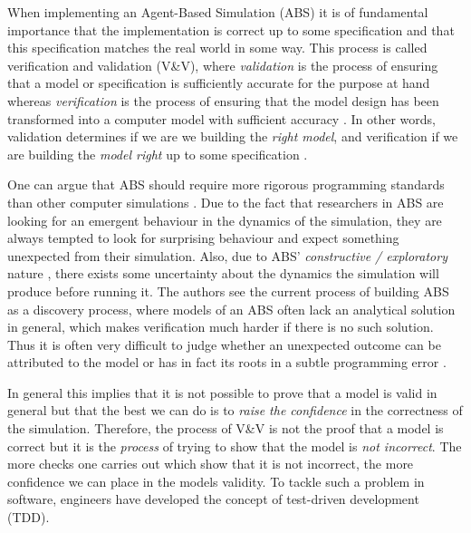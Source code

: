 \label{ch:property}

When implementing an Agent-Based Simulation (ABS) it is of fundamental importance that the implementation is correct up to some specification and that this specification matches the real world in some way. This process is called verification and validation (V\&V), where \textit{validation} is the process of ensuring that a model or specification is sufficiently accurate for the purpose at hand whereas \textit{verification} is the process of ensuring that the model design has been transformed into a computer model with sufficient accuracy \cite{robinson_simulation:_2014}. In other words, validation determines if we are we building the \textit{right model}, and verification if we are building the \textit{model right} up to some specification \cite{balci_verification_1998}.

One can argue that ABS should require more rigorous programming standards than other computer simulations \cite{polhill_ghost_2005}. Due to the fact that researchers in ABS are looking for an emergent behaviour in the dynamics of the simulation, they are always tempted to look for surprising behaviour and expect something unexpected from their simulation. 
Also, due to ABS' \textit{constructive / exploratory} nature \cite{epstein_chapter_2006, epstein_generative_2012}, there exists some uncertainty about the dynamics the simulation will produce before running it. The authors \cite{ormerod_validation_2006} see the current process of building ABS as a discovery process, where models of an ABS often lack an analytical solution in general, which makes verification much harder if there is no such solution. Thus it is often very difficult to judge whether an unexpected outcome can be attributed to the model or has in fact its roots in a subtle programming error \cite{galan_errors_2009}.

In general this implies that it is not possible to prove that a model is valid in general but that the best we can do is to \textit{raise the confidence} in the correctness of the simulation. Therefore, the process of V\&V is not the proof that a model is correct but it is the \textit{process} of trying to show that the model is \textit{not incorrect}. The more checks one carries out which show that it is not incorrect, the more confidence we can place in the models validity. To tackle such a problem in software, engineers have developed the concept of test-driven development (TDD).

